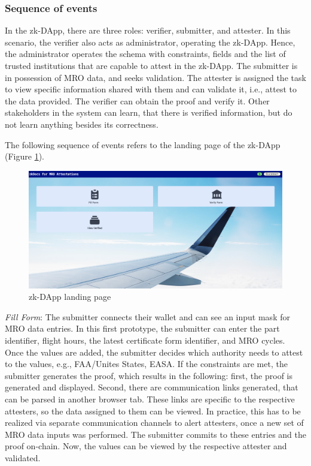 \subsubsection{Sequence of events}
In the zk-DApp, there are three roles: verifier, submitter, and attester. In this scenario, the verifier also acts as administrator, operating the zk-DApp. Hence, the administrator operates the schema with constraints, fields and the list of trusted institutions that are capable to attest in the zk-DApp. The submitter is in possession of MRO data, and seeks validation. The attester is assigned the task to view specific information shared with them and can validate it, i.e., attest to the data provided. The verifier can obtain the proof and verify it. Other stakeholders in the system can learn, that there is verified information, but do not learn anything besides its correctness.

The following sequence of events refers to the landing page of the zk-DApp (Figure \ref{fig:landing-page}).
\begin{figure}[hbt]
	\centering
		\includegraphics[width=1.0\textwidth]{Pictures/landingpage.png}
	\caption{zk-DApp landing page}
	\label{fig:landing-page}
\end{figure}

\textit{Fill Form}:
The submitter connects their wallet and can see an input mask for MRO data entries. In this first prototype, the submitter can enter the part identifier, flight hours, the latest certificate form identifier, and MRO cycles. Once the values are added, the submitter decides which authority needs to attest to the values, e.g., FAA/Unites States, EASA. If the constraints are met, the submitter generates the proof, which results in the following: first, the proof is generated and displayed. Second, there are communication links generated, that can be parsed in another browser tab. These links are specific to the respective attesters, so the data assigned to them can be viewed. In practice, this has to be realized via separate communication channels to alert attesters, once a new set of MRO data inputs was performed. The submitter commits to these entries and the proof on-chain. Now, the values can be viewed by the respective attester and validated.

